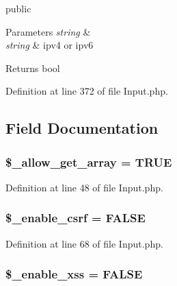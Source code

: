public 
\begin{DoxyParams}{Parameters}
{\em string} & \\
\hline
{\em string} & ipv4 or ipv6 \\
\hline
\end{DoxyParams}
\begin{DoxyReturn}{Returns}
bool 
\end{DoxyReturn}


Definition at line 372 of file Input.\-php.



\subsection{Field Documentation}
\hypertarget{class_c_i___input_a359b1debb6f1d80e345d6215af6946fb}{
\subsubsection[{\$\-\_\-allow\-\_\-get\-\_\-array}]{\setlength{\rightskip}{0pt plus 5cm}\$\-\_\-allow\-\_\-get\-\_\-array = T\-R\-U\-E}}\label{class_c_i___input_a359b1debb6f1d80e345d6215af6946fb}


Definition at line 48 of file Input.\-php.

\hypertarget{class_c_i___input_a463c89c07e7cf7f5e4337a2a8e460d17}{
\subsubsection[{\$\-\_\-enable\-\_\-csrf}]{\setlength{\rightskip}{0pt plus 5cm}\$\-\_\-enable\-\_\-csrf = F\-A\-L\-S\-E}}\label{class_c_i___input_a463c89c07e7cf7f5e4337a2a8e460d17}


Definition at line 68 of file Input.\-php.

\hypertarget{class_c_i___input_a42b707bea5d9604a7460e953d9e39d7d}{
\subsubsection[{\$\-\_\-enable\-\_\-xss}]{\setlength{\rightskip}{0pt plus 5cm}\$\-\_\-enable\-\_\-xss = F\-A\-L\-S\-E}}\label{class_c_i___input_a42b707bea5d9604a7460e953d9e39d7d}


